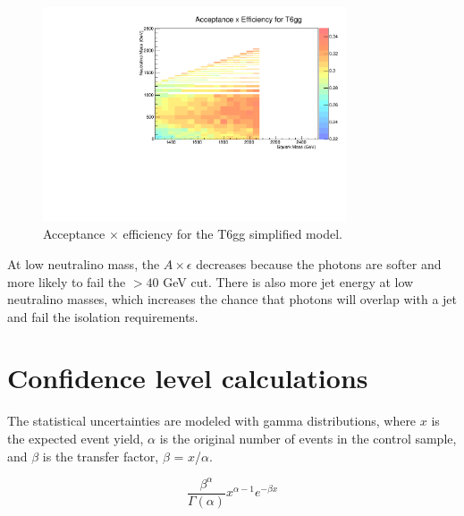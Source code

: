 \begin{figure}[h]
\begin{center}
\includegraphics[width=0.8\textwidth]{Figures/Results/accXeff_T6gg.pdf}
\end{center}
    \caption{Acceptance $\times$ efficiency for the T6gg simplified model.}
    \label{fig:accXeff_T6gg}
\end{figure}


At low neutralino mass, the $A \times \epsilon$ decreases because the photons are softer and more likely to fail the \pT $> 40$ GeV cut.
There is also more jet energy at low neutralino masses, which increases the chance that photons will overlap with a jet and fail the 
isolation requirements.


\section{Confidence level calculations}
\label{sec:cls}

The statistical uncertainties are modeled with gamma distributions, where $x$ is the expected event yield, 
$\alpha$ is the original number of events in the control sample, 
and $\beta$ is the transfer factor, $\beta$ = $x$/$\alpha$. 

\begin{equation}
	\dfrac{\beta^\alpha}{\Gamma(\alpha)} x^{\alpha-1}e^{-\beta x}
\end{equation}


